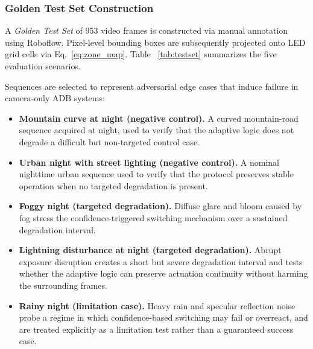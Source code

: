 \documentclass[pdflatex,sn-mathphys-num]{sn-jnl}%
\theoremstyle{thmstyleone}%
\theoremstyle{thmstyletwo}%
\theoremstyle{thmstylethree}%
\begin{document}
\subsubsection{Golden Test Set Construction}
\label{subsec:testset}

A \emph{Golden Test Set} of 953 video frames is constructed via manual
annotation using Roboflow. Pixel-level bounding boxes are subsequently
projected onto LED grid cells via Eq.~\eqref{eq:zone_map}. Table
~\ref{tab:testset} summarizes the five evaluation scenarios.

Sequences are selected to represent adversarial edge cases that induce
failure in camera-only ADB systems:

\begin{itemize}
    \item \textbf{Mountain curve at night (negative control).} A curved
    mountain-road sequence acquired at night, used to verify that the
    adaptive logic does not degrade a difficult but non-targeted control case.

    \item \textbf{Urban night with street lighting (negative control).} A nominal
    nighttime urban sequence used to verify that the protocol preserves stable
    operation when no targeted degradation is present.

    \item \textbf{Foggy night (targeted degradation).} Diffuse
    glare and bloom caused by fog stress the confidence-triggered
    switching mechanism over a sustained degradation interval.

    \item \textbf{Lightning disturbance at night (targeted degradation).} Abrupt
    exposure disruption creates a short but severe degradation interval
    and tests whether the adaptive logic can preserve actuation
    continuity without harming the surrounding frames.

    \item \textbf{Rainy night (limitation case).} Heavy rain and
    specular reflection noise probe a regime in which confidence-based
    switching may fail or overreact, and are treated explicitly as a
    limitation test rather than a guaranteed success case.
\end{itemize}
\end{document}
